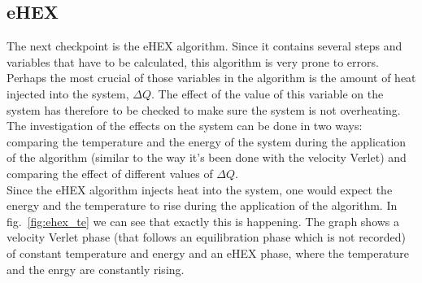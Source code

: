 \documentclass[12pt]{article}
\begin{document}
\subsection{eHEX}
The next checkpoint is the eHEX algorithm. Since it contains several steps and variables that have to be calculated, this algorithm is very prone
to errors. Perhaps the most crucial of those variables in the algorithm is the amount of heat injected into the system, $\Delta Q$. 
The effect of the value of this variable on the system has therefore to be checked to make sure the system is not overheating.\\
The investigation of the effects on the system can be done in two ways: comparing the temperature and the energy of the system during the 
application of the algorithm (similar to the way it's been done with the velocity Verlet) and comparing the effect of different values of $\Delta Q$.\\
Since the eHEX algorithm injects heat into the system, one would expect the energy and the temperature to rise during the application of the
algorithm. In fig.~\ref{fig:ehex_te} we can see that exactly this is happening. The graph shows a velocity Verlet phase (that follows an equilibration
phase which is not recorded) of constant temperature and energy and an eHEX phase, where the temperature and the enrgy are constantly rising. 
\end{document}
